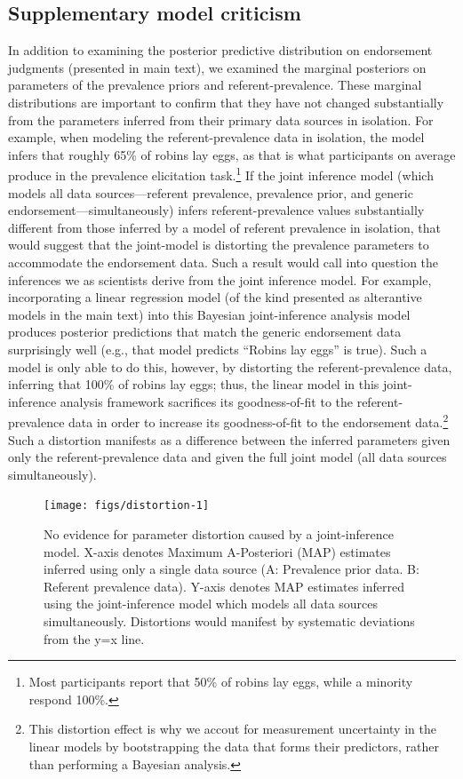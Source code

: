 \documentclass[english,,man,floatsintext]{apa6}
\let\rmarkdownfootnote\footnote%
\def\footnote{\protect\rmarkdownfootnote}
\theoremstyle{definition}
\theoremstyle{definition}
\theoremstyle{definition}
\theoremstyle{remark}
\begin{document}
\hypertarget{supplementary-model-criticism}{%
\subsection{Supplementary model
criticism}\label{supplementary-model-criticism}}

In addition to examining the posterior predictive distribution on
endorsement judgments (presented in main text), we examined the marginal
posteriors on parameters of the prevalence priors and
referent-prevalence. These marginal distributions are important to
confirm that they have not changed substantially from the parameters
inferred from their primary data sources in isolation. For example, when
modeling the referent-prevalence data in isolation, the model infers
that roughly 65\% of robins lay eggs, as that is what participants on
average produce in the prevalence elicitation task.\footnote{Most
  participants report that 50\% of robins lay eggs, while a minority
  respond 100\%.} If the joint inference model (which models all data
sources---referent prevalence, prevalence prior, and generic
endorsement---simultaneously) infers referent-prevalence values
substantially different from those inferred by a model of referent
prevalence in isolation, that would suggest that the joint-model is
distorting the prevalence parameters to accommodate the endorsement
data. Such a result would call into question the inferences we as
scientists derive from the joint inference model. For example,
incorporating a linear regression model (of the kind presented as
alterantive models in the main text) into this Bayesian joint-inference
analysis model produces posterior predictions that match the generic
endorsement data surprisingly well (e.g., that model predicts
\enquote{Robins lay eggs} is true). Such a model is only able to do
this, however, by distorting the referent-prevalence data, inferring
that 100\% of robins lay eggs; thus, the linear model in this
joint-inference analysis framework sacrifices its goodness-of-fit to the
referent-prevalence data in order to increase its goodness-of-fit to the
endorsement data.\footnote{This distortion effect is why we accout for
  measurement uncertainty in the linear models by bootstrapping the data
  that forms their predictors, rather than performing a Bayesian
  analysis.} Such a distortion manifests as a difference between the
inferred parameters given only the referent-prevalence data and given
the full joint model (all data sources simultaneously).

\begin{figure}

{\centering \texttt{[image: figs/distortion-1]} 

}

\caption{No evidence for parameter distortion caused by a joint-inference model. X-axis denotes Maximum A-Posteriori (MAP) estimates inferred using only a single data source (A: Prevalence prior data. B: Referent prevalence data). Y-axis denotes MAP estimates inferred using the joint-inference model which models all data sources simultaneously. Distortions would manifest by systematic deviations from the y=x line.}\label{fig:distortion}
\end{figure}
\end{document}
